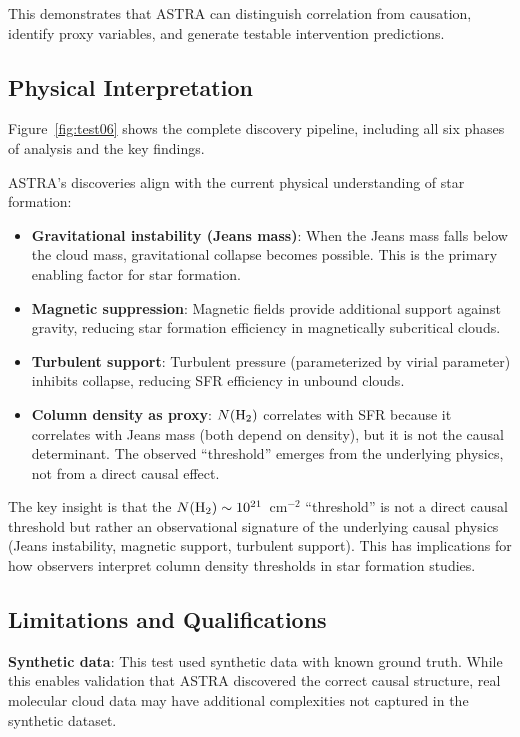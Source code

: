 \documentclass[usenatbib]{rasti}
\begin{document}
This demonstrates that ASTRA can distinguish correlation from causation, identify proxy variables, and generate testable intervention predictions.

\subsection{Physical Interpretation}

Figure~\ref{fig:test06} shows the complete discovery pipeline, including all six phases of analysis and the key findings.

ASTRA's discoveries align with the current physical understanding of star formation:

\begin{itemize}
\item \textbf{Gravitational instability (Jeans mass)}: When the Jeans mass falls below the cloud mass, gravitational collapse becomes possible. This is the primary enabling factor for star formation.
\item \textbf{Magnetic suppression}: Magnetic fields provide additional support against gravity, reducing star formation efficiency in magnetically subcritical clouds.
\item \textbf{Turbulent support}: Turbulent pressure (parameterized by virial parameter) inhibits collapse, reducing SFR efficiency in unbound clouds.
\item \textbf{Column density as proxy}: $N({\rm H_2})$ correlates with SFR because it correlates with Jeans mass (both depend on density), but it is not the causal determinant. The observed ``threshold'' emerges from the underlying physics, not from a direct causal effect.
\end{itemize}

The key insight is that the $N({\rm H_2}) \sim 10^{21}$~cm$^{-2}$ ``threshold'' is not a direct causal threshold but rather an observational signature of the underlying causal physics (Jeans instability, magnetic support, turbulent support). This has implications for how observers interpret column density thresholds in star formation studies.

\subsection{Limitations and Qualifications}

\textbf{Synthetic data}: This test used synthetic data with known ground truth. While this enables validation that ASTRA discovered the correct causal structure, real molecular cloud data may have additional complexities not captured in the synthetic dataset.
\end{document}
